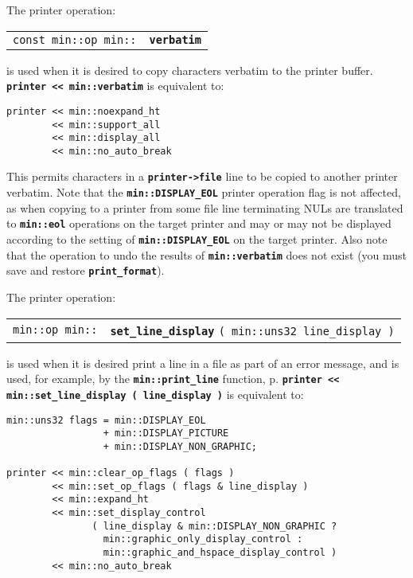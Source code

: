 \documentclass[12pt]{article}
\makeatletter
\newcommand{\TT}[1]{{\tt \bfseries #1}}
\newcommand{\ttindex}[1]{\index{#1@{\tt #1}}}
\newcommand{\pagref}[1]{p\pageref{#1}}
\newcommand{\EOL}{\penalty \exhyphenpenalty}
\newenvironment{indpar}[1][0.3in]%
	{\begin{list}{}%
		     {\setlength{\itemsep}{0in}%
		      \setlength{\topsep}{0in}%
		      \setlength{\parsep}{1ex}%
		      \setlength{\labelwidth}{#1}%
		      \setlength{\leftmargin}{#1}%
		      \addtolength{\leftmargin}{\labelsep}}%
	 \item}%
	{\end{list}}
\newcommand{\LABEL}[1]{\label{#1}}
\newcommand{\MINKEY}[1]%
	   {\TT{#1}\ttindex{min::#1}\ttindex{#1}}
\makeatother
\begin{document}
The printer operation:

\begin{indpar}[1em]\begin{tabular}{r@{}l}
\verb|const min::op min::| & \MINKEY{verbatim}
\LABEL{MIN::VERBATIM} \\
\end{tabular}\end{indpar}

is used when it is desired to copy characters verbatim to the
printer buffer.  \TT{printer <{}< min::\EOL verbatim} is equivalent to:

\begin{indpar}\begin{verbatim}
printer << min::noexpand_ht
        << min::support_all
        << min::display_all
        << min::no_auto_break
\end{verbatim}\end{indpar}

This permits characters in a \TT{printer->file} line to be copied
to another printer verbatim.  Note that
the \TT{min::\EOL DISPLAY\_\EOL EOL} printer operation flag
is not affected, as when copying to a printer from some file
line terminating NULs are translated to \TT{min::\EOL eol}
operations on the target printer and may or may not be
displayed according to the setting of
\TT{min::\EOL DISPLAY\_\EOL EOL} on the target printer.
Also note that the operation to undo the results
of \TT{min::\EOL verbatim} does not exist (you must save and restore
\TT{print\_\EOL format}).

The printer operation:

\begin{indpar}[1em]\begin{tabular}{r@{}l}
\verb|min::op min::|
    & \MINKEY{set\_line\_display} \verb|( min::uns32 line_display )|
\LABEL{MIN::SET_LINE_DISPLAY} \\
\end{tabular}\end{indpar}

is used when it is desired print a line in a file as part of an
error message, and is used, for example, by the
\TT{min::\EOL print\_\EOL line} function, \pagref{MIN::PRINT_LINE}.
\TT{printer <{}< min::\EOL set\_\EOL line\_\EOL display ( line\_\EOL display )}
is equivalent to:

\begin{indpar}\begin{verbatim}
min::uns32 flags = min::DISPLAY_EOL
                 + min::DISPLAY_PICTURE
                 + min::DISPLAY_NON_GRAPHIC;

printer << min::clear_op_flags ( flags )
        << min::set_op_flags ( flags & line_display )
        << min::expand_ht
        << min::set_display_control
               ( line_display & min::DISPLAY_NON_GRAPHIC ?
                 min::graphic_only_display_control :
                 min::graphic_and_hspace_display_control )
        << min::no_auto_break
\end{verbatim}\end{indpar}
\end{document}
